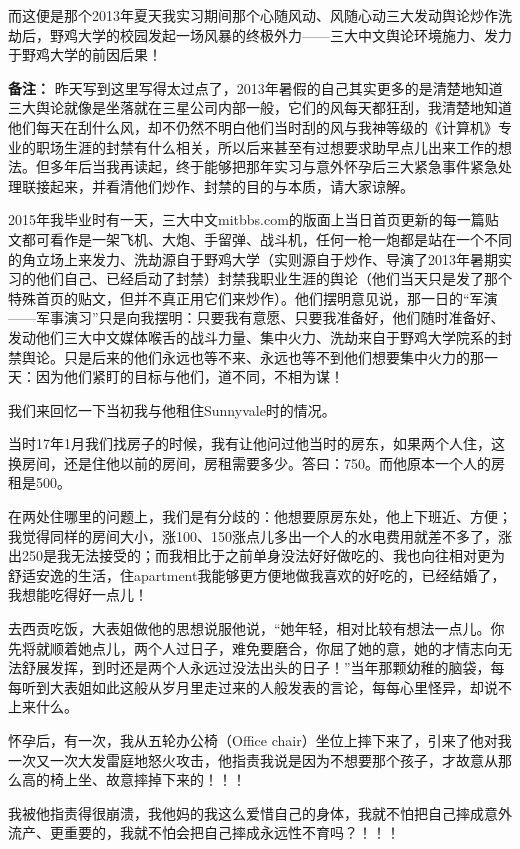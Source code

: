 \documentclass[9pt, b5paper]{article}
\begin{document}
而这便是那个2013年夏天我实习期间那个心随风动、风随心动三大发动舆论炒作洗劫后，野鸡大学的校园发起一场风暴的终极外力——三大中文舆论环境施力、发力于野鸡大学的前因后果！

\textbf{备注：} 昨天写到这里写得太过点了，2013年暑假的自己其实更多的是清楚地知道三大舆论就像是坐落就在三星公司内部一般，它们的风每天都狂刮，我清楚地知道他们每天在刮什么风，却不仍然不明白他们当时刮的风与我神等级的《计算机》专业的职场生涯的封禁有什么相关，所以后来甚至有过想要求助早点儿出来工作的想法。但多年后当我再读起，终于能够把那年实习与意外怀孕后三大紧急事件紧急处理联接起来，并看清他们炒作、封禁的目的与本质，请大家谅解。 

2015年我毕业时有一天，三大中文mitbbs.com的版面上当日首页更新的每一篇贴文都可看作是一架飞机、大炮、手留弹、战斗机，任何一枪一炮都是站在一个不同的角立场上来发力、洗劫源自于野鸡大学（实则源自于炒作、导演了2013年暑期实习的他们自己、已经启动了封禁）封禁我职业生涯的舆论（他们当天只是发了那个特殊首页的贴文，但并不真正用它们来炒作）。他们摆明意见说，那一日的“军演——军事演习”只是向我摆明：只要我有意愿、只要我准备好，他们随时准备好、发动他们三大中文媒体喉舌的战斗力量、集中火力、洗劫来自于野鸡大学院系的封禁舆论。只是后来的他们永远也等不来、永远也等不到他们想要集中火力的那一天：因为他们紧盯的目标与他们，道不同，不相为谋！

我们来回忆一下当初我与他租住Sunnyvale时的情况。

当时17年1月我们找房子的时候，我有让他问过他当时的房东，如果两个人住，这换房间，还是住他以前的房间，房租需要多少。答曰：750。而他原本一个人的房租是500。

在两处住哪里的问题上，我们是有分歧的：他想要原房东处，他上下班近、方便；我觉得同样的房间大小，涨100、150涨点儿多出一个人的水电费用就差不多了，涨出250是我无法接受的；而我相比于之前单身没法好好做吃的、我也向往相对更为舒适安逸的生活，住apartment我能够更方便地做我喜欢的好吃的，已经结婚了，我想能吃得好一点儿！

去西贡吃饭，大表姐做他的思想说服他说，“她年轻，相对比较有想法一点儿。你先将就顺着她点儿，两个人过日子，难免要磨合，你屈了她的意，她的才情志向无法舒展发挥，到时还是两个人永远过没法出头的日子！”当年那颗幼稚的脑袋，每每听到大表姐如此这般从岁月里走过来的人般发表的言论，每每心里怪异，却说不上来什么。

怀孕后，有一次，我从五轮办公椅（Office chair）坐位上摔下来了，引来了他对我一次又一次大发雷庭地怒火攻击，他指责我说是因为不想要那个孩子，才故意从那么高的椅上坐、故意摔掉下来的！！！

我被他指责得很崩溃，我他妈的我这么爱惜自己的身体，我就不怕把自己摔成意外流产、更重要的，我就不怕会把自己摔成永远性不育吗？！！！
\end{document}
